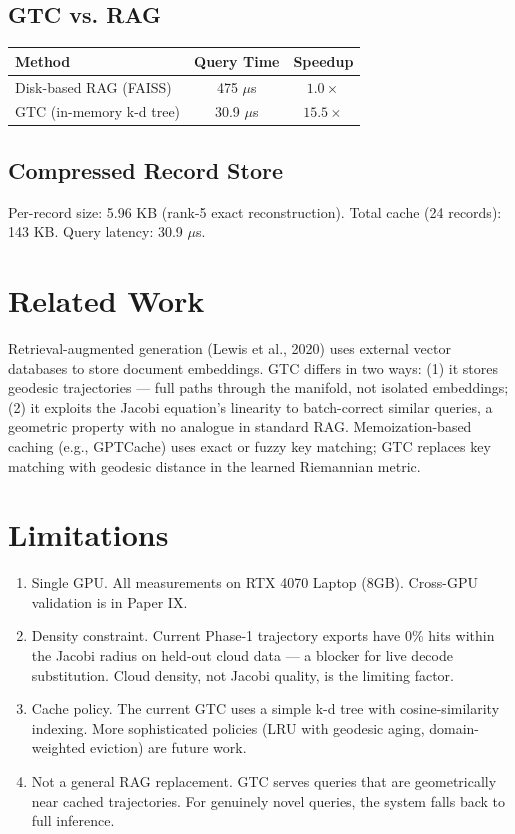 \documentclass[11pt,a4paper]{article}
\begin{document}
\subsection{GTC vs. RAG}

\begin{table}[h]\centering
\begin{tabular}{lcc}\toprule
Method & Query Time & Speedup \\\midrule
Disk-based RAG (FAISS) & 475 $\mu$s & $1.0\times$ \\
GTC (in-memory k-d tree) & 30.9 $\mu$s & $15.5\times$ \\\bottomrule
\end{tabular}
\end{table}

\subsection{Compressed Record Store}

Per-record size: 5.96 KB (rank-5 exact reconstruction). Total cache
(24 records): 143 KB. Query latency: 30.9 $\mu$s.

\section{Related Work}

Retrieval-augmented generation (Lewis et al., 2020) uses external vector
databases to store document embeddings. GTC differs in two ways: (1) it
stores geodesic trajectories — full paths through the manifold,
not isolated embeddings; (2) it exploits the Jacobi equation's
linearity to batch-correct similar queries, a geometric property with
no analogue in standard RAG. Memoization-based caching (e.g., GPTCache)
uses exact or fuzzy key matching; GTC replaces key matching with
geodesic distance in the learned Riemannian metric.

\section{Limitations}

\begin{enumerate}
\item Single GPU. All measurements on RTX 4070 Laptop (8GB).
      Cross-GPU validation is in Paper IX.
\item Density constraint. Current Phase-1 trajectory exports
      have 0\% hits within the Jacobi radius on held-out cloud data —
      a blocker for live decode substitution. Cloud density, not Jacobi
      quality, is the limiting factor.
\item Cache policy. The current GTC uses a simple k-d tree with
      cosine-similarity indexing. More sophisticated policies (LRU with
      geodesic aging, domain-weighted eviction) are future work.
\item Not a general RAG replacement. GTC serves queries that
      are geometrically near cached trajectories. For genuinely novel
      queries, the system falls back to full inference.
\end{enumerate}
\end{document}

